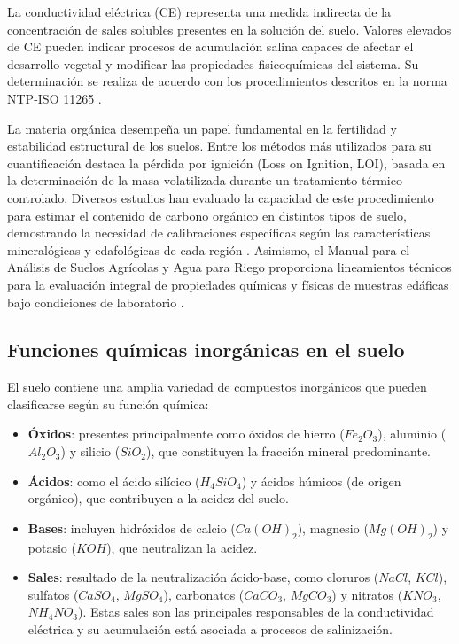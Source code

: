 \documentclass[fleqn]{jaes}
\begin{document}
La conductividad eléctrica (CE) representa una medida indirecta de la concentración de sales solubles presentes en la solución del suelo. Valores elevados de CE pueden indicar procesos de acumulación salina capaces de afectar el desarrollo vegetal y modificar las propiedades fisicoquímicas del sistema. Su determinación se realiza de acuerdo con los procedimientos descritos en la norma NTP-ISO 11265 \cite{INACAL2018}.

La materia orgánica desempeña un papel fundamental en la fertilidad y estabilidad estructural de los suelos. Entre los métodos más utilizados para su cuantificación destaca la pérdida por ignición (Loss on Ignition, LOI), basada en la determinación de la masa volatilizada durante un tratamiento térmico controlado. Diversos estudios han evaluado la capacidad de este procedimiento para estimar el contenido de carbono orgánico en distintos tipos de suelo, demostrando la necesidad de calibraciones específicas según las características mineralógicas y edafológicas de cada región \cite{Martnez2017,Dabadie2018}. Asimismo, el Manual para el Análisis de Suelos Agrícolas y Agua para Riego proporciona lineamientos técnicos para la evaluación integral de propiedades químicas y físicas de muestras edáficas bajo condiciones de laboratorio \cite{InstitutoNacionaldeInnovacinAgrariaINIA2021}.

\subsection{Funciones químicas inorgánicas en el suelo}

El suelo contiene una amplia variedad de compuestos inorgánicos que pueden clasificarse según su función química:

\begin{itemize}
  \item \textbf{Óxidos}: presentes principalmente como óxidos de hierro ($Fe_2O_3$), aluminio ($Al_2O_3$) y silicio ($SiO_2$), que constituyen la fracción mineral predominante.
  \item \textbf{Ácidos}: como el ácido silícico ($H_4SiO_4$) y ácidos húmicos (de origen orgánico), que contribuyen a la acidez del suelo.
  \item \textbf{Bases}: incluyen hidróxidos de calcio ($Ca(OH)_2$), magnesio ($Mg(OH)_2$) y potasio ($KOH$), que neutralizan la acidez.
  \item \textbf{Sales}: resultado de la neutralización ácido-base, como cloruros ($NaCl$, $KCl$), sulfatos ($CaSO_4$, $MgSO_4$), carbonatos ($CaCO_3$, $MgCO_3$) y nitratos ($KNO_3$, $NH_4NO_3$). Estas sales son las principales responsables de la conductividad eléctrica y su acumulación está asociada a procesos de salinización.
\end{itemize}
\end{document}
